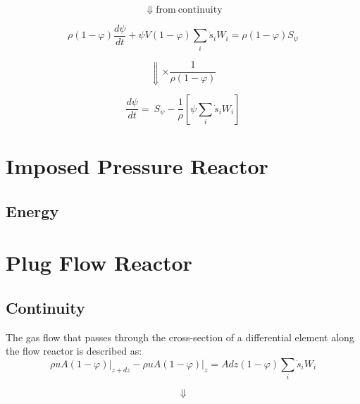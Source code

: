 \begin{equation*}
	\Downarrow \mathrm{from\: continuity}
\end{equation*}

\begin{equation*}
	\rho\left(1-\varphi\right)\frac{d\psi}{dt}
	+
	\psi V\left(1-\varphi\right)\sum_{i}{{\dot{s}}_iW_i}
	=
	\rho(1-\varphi)S_{\psi}
\end{equation*}

\begin{equation*}
	\Downarrow \times \frac{1}{\rho(1-\varphi)}
\end{equation*}

\begin{equation}
	\frac{d\psi}{dt}=\ S_{\psi}-\frac{1}{\rho}\left[\psi\sum_{i}{{\dot{s}}_iW_i}\right]
	\label{eqn:app_sootconstuv}
\end{equation}

\section{Imposed Pressure Reactor}
\label{sec:derivipr}

\subsection{Energy}

\section{Plug Flow Reactor}
\label{sec:derivpfr}

\subsection{Continuity}
The gas flow that passes through the cross-section of a differential element along the flow reactor is described as:
\begin{equation*}
	{\rho uA\left(1-\varphi\right)|}_{z+dz}-{\rho uA\left(1-\varphi\right)|}_z
	=
	Adz(1-\varphi)\sum_{i}{{\dot{s}}_iW_i}
\end{equation*}

\begin{equation*}
	\Downarrow
\end{equation*}

